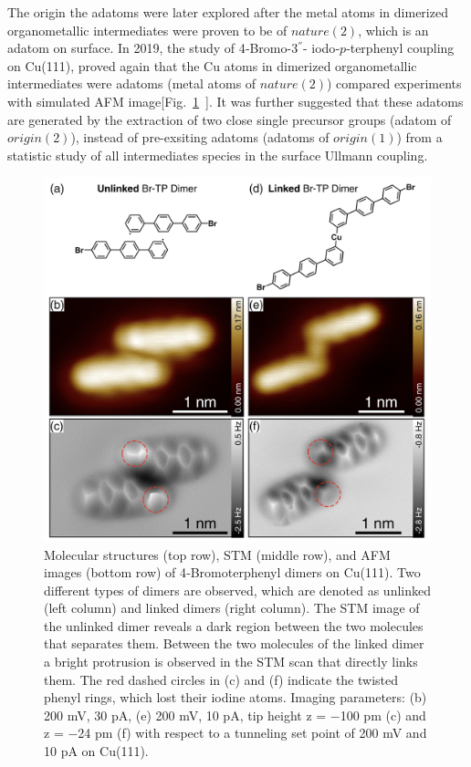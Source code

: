 \documentclass[%
 reprint,
 amsmath,amssymb,
 aps,
prb,
]{revtex4-2}
\begin{document}
The origin the adatoms were later explored after the metal atoms in dimerized organometallic intermediates were proven to be of $nature(2)$, which is an adatom on surface. In 2019, the study of 4‐Bromo-3$^{''}$- iodo‐$p$‐terphenyl coupling on Cu(111), proved again that the Cu atoms in dimerized organometallic intermediates were adatoms (metal atoms of $nature(2)$) compared experiments with simulated AFM image[Fig.~\ref{fig:6}~\cite{acsnano2019}]. It was further suggested that these adatoms are generated by the extraction of two close single precursor groups (adatom of $origin(2)$), instead of pre-exsiting adatoms (adatoms of $origin(1)$) from a statistic study of all intermediates species in the surface Ullmann coupling.
%
\begin{figure}[ht]
\centering
\includegraphics[width=0.75\columnwidth]{Fig/AFM_prove.png}
\caption{Molecular structures (top row), STM (middle row), and AFM images (bottom row) of 4‐Bromoterphenyl dimers on Cu(111). Two different types of dimers are observed, which are denoted as unlinked (left column) and linked dimers (right column). The STM image of the unlinked dimer reveals a dark region between the two molecules that separates them. Between the two molecules of the linked dimer a bright protrusion is observed in the STM scan that directly links them. The red dashed circles in (c) and (f) indicate the twisted phenyl rings, which lost their iodine atoms. Imaging parameters: (b) 200 mV, 30 pA, (e) 200 mV, 10 pA, tip height z = −100 pm (c) and z = −24 pm (f) with respect to a tunneling set point of 200 mV and 10 pA on Cu(111).}
\label{fig:6}
\end{figure}
\end{document}
